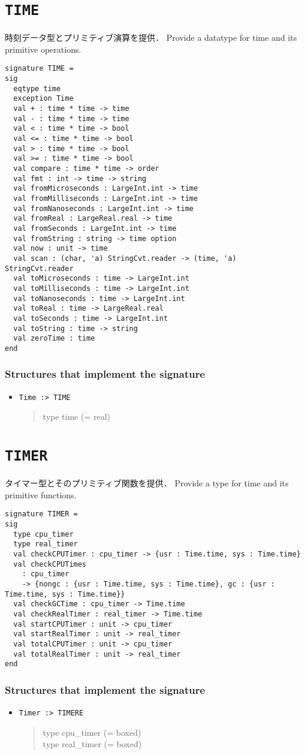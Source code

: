 \documentclass{jbook}
\newcommand{\txt}[2]{#2}
\newcommand{\code}[1]{\mbox{\large\tt #1}}
\newenvironment{program}{\begin{quote}\begin{tt}}%
                        {\end{tt}\end{quote}}
\newcommand{\signature}[2]{
\section{{\tt #1}}\label{section:reference:#2}
}
\newcommand{\Structure}{\subsubsection*{\txt{シグネチャを実装するストラクチャ}{Structures that implement the signature}}}
\begin{document}
\signature{TIME}{TIME}
\ifjp%
	時刻データ型とプリミティブ演算を提供．
\else%
	Provide a datatype for time and its primitive operations.
\fi%

\begin{verbatim}
signature TIME =
sig
  eqtype time
  exception Time
  val + : time * time -> time
  val - : time * time -> time
  val < : time * time -> bool
  val <= : time * time -> bool
  val > : time * time -> bool
  val >= : time * time -> bool
  val compare : time * time -> order
  val fmt : int -> time -> string
  val fromMicroseconds : LargeInt.int -> time
  val fromMilliseconds : LargeInt.int -> time
  val fromNanoseconds : LargeInt.int -> time
  val fromReal : LargeReal.real -> time
  val fromSeconds : LargeInt.int -> time
  val fromString : string -> time option
  val now : unit -> time
  val scan : (char, 'a) StringCvt.reader -> (time, 'a) StringCvt.reader
  val toMicroseconds : time -> LargeInt.int
  val toMilliseconds : time -> LargeInt.int
  val toNanoseconds : time -> LargeInt.int
  val toReal : time -> LargeReal.real
  val toSeconds : time -> LargeInt.int
  val toString : time -> string
  val zeroTime : time
end
\end{verbatim}

\Structure
\begin{itemize}
\item \code{Time :> TIME}
\begin{program}
   type time (= real)
\end{program}
\end{itemize}

\signature{TIMER}{TIMER}
\ifjp%
	タイマー型とそのプリミティブ関数を提供．
\else%
	Provide a type for time and its primitive functions.
\fi%
\begin{verbatim}
signature TIMER =
sig
  type cpu_timer
  type real_timer
  val checkCPUTimer : cpu_timer -> {usr : Time.time, sys : Time.time}
  val checkCPUTimes
    : cpu_timer 
	-> {nongc : {usr : Time.time, sys : Time.time}, gc : {usr : Time.time, sys : Time.time}}
  val checkGCTime : cpu_timer -> Time.time
  val checkRealTimer : real_timer -> Time.time
  val startCPUTimer : unit -> cpu_timer
  val startRealTimer : unit -> real_timer
  val totalCPUTimer : unit -> cpu_timer
  val totalRealTimer : unit -> real_timer
end
\end{verbatim}
\Structure
\begin{itemize}
\item \code{Timer :> TIMERE}
\begin{program}
   type cpu\_timer (= boxed)
\\
   type real\_timer (= boxed)
\end{program}
\end{itemize}
\end{document}
